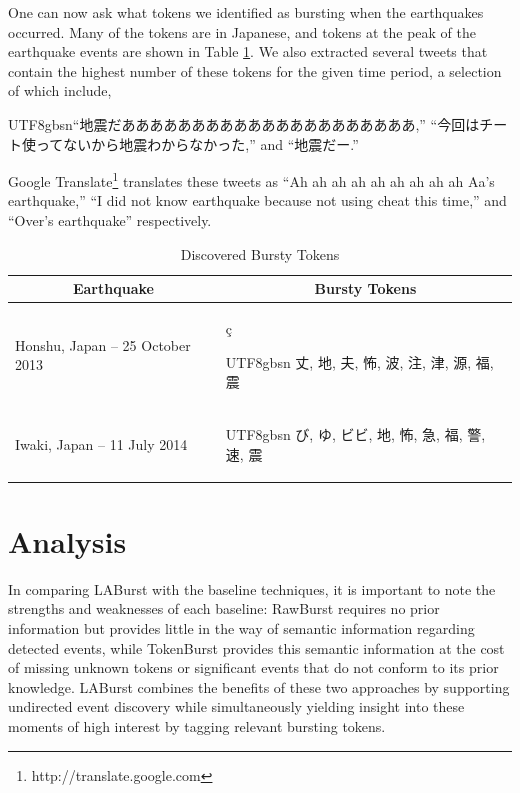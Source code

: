 \documentclass[letterpaper]{article}
\newcommand{\myfont}{gbsn}
\begin{document}
One can now ask what tokens we identified as bursting when the earthquakes occurred.
Many of the tokens are in Japanese, and tokens at the peak of the earthquake events are shown in Table \ref{tab:japanTokens}.
We also extracted several tweets that contain the highest number of these tokens for the given time period, a selection of which include, \begin{CJK}{UTF8}{\myfont}``地震だあああああああああああああああああああああ,'' ``今回はチート使ってないから地震わからなかった,'' and ``地震だー.'' \end{CJK}
Google Translate\footnote{http://translate.google.com} translates these tweets as ``Ah ah ah ah ah ah ah ah ah Aa's earthquake,'' ``I did not know earthquake because not using cheat this time,'' and ``Over's earthquake'' respectively.
%
\begin{table}[htdp]
\footnotesize
\caption{Discovered Bursty Tokens}
\begin{center}
\begin{tabular}{|p{1.45in} | p{1.45in} |}
\hline
\multicolumn{1}{|c|}{\textbf{Earthquake}} & \multicolumn{1}{|c|}{\textbf{Bursty Tokens}} \\ \hline
Honshu, Japan -- 25 October 2013 & \c{c}\begin{CJK}{UTF8}{\myfont} 丈, 地, 夫, 怖, 波, 注, 津, 源, 福, 震 \end{CJK} \\ \hline
Iwaki, Japan -- 11 July 2014 & \begin{CJK}{UTF8}{\myfont} び, ゆ, ビビ, 地, 怖, 急, 福, 警, 速, 震 \end{CJK} \\ \hline
\end{tabular}
\end{center}
\label{tab:japanTokens}
\end{table}

\section{Analysis}
\label{sect:analysis}

In comparing LABurst with the baseline techniques, it is important to note the strengths and weaknesses of each baseline: RawBurst requires no prior information but provides little in the way of semantic information regarding detected events, while TokenBurst provides this semantic information at the cost of missing unknown tokens or significant events that do not conform to its prior knowledge.
LABurst combines the benefits of these two approaches by supporting undirected event discovery while simultaneously yielding insight into these moments of high interest by tagging relevant bursting tokens.
\end{document}
